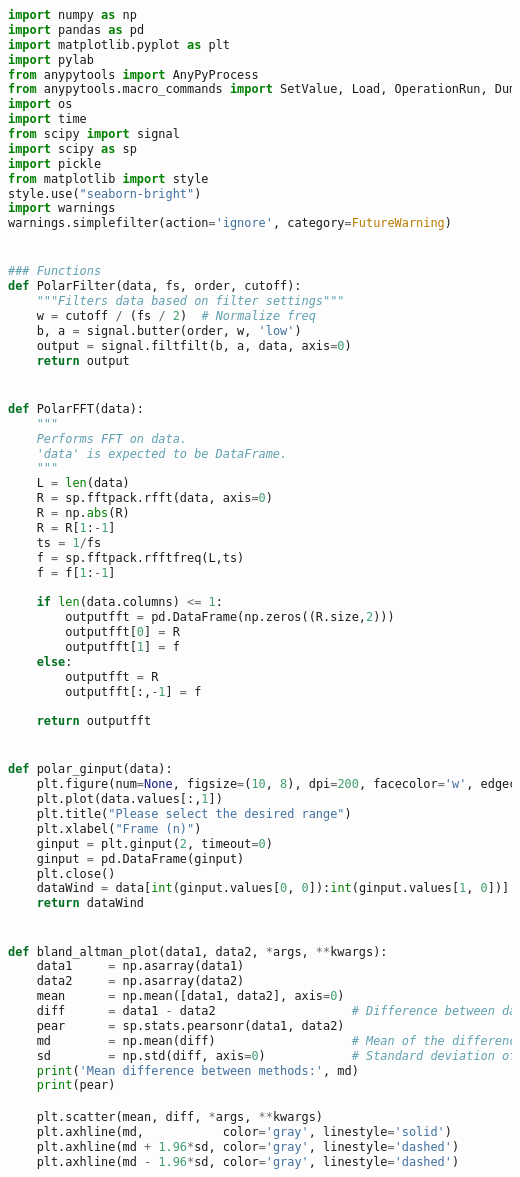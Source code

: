 \begin{lstlisting}[language=Python]
import numpy as np
import pandas as pd
import matplotlib.pyplot as plt
import pylab
from anypytools import AnyPyProcess
from anypytools.macro_commands import SetValue, Load, OperationRun, Dump
import os
import time
from scipy import signal
import scipy as sp
import pickle
from matplotlib import style
style.use("seaborn-bright")
import warnings
warnings.simplefilter(action='ignore', category=FutureWarning)


### Functions
def PolarFilter(data, fs, order, cutoff):
    """Filters data based on filter settings"""
    w = cutoff / (fs / 2)  # Normalize freq
    b, a = signal.butter(order, w, 'low')
    output = signal.filtfilt(b, a, data, axis=0)
    return output


def PolarFFT(data):
    """
    Performs FFT on data.
    'data' is expected to be DataFrame.
    """
    L = len(data)   
    R = sp.fftpack.rfft(data, axis=0)     
    R = np.abs(R)
    R = R[1:-1]
    ts = 1/fs
    f = sp.fftpack.rfftfreq(L,ts)
    f = f[1:-1]   
    
    if len(data.columns) <= 1:
        outputfft = pd.DataFrame(np.zeros((R.size,2)))
        outputfft[0] = R
        outputfft[1] = f
    else:   
        outputfft = R
        outputfft[:,-1] = f
    
    return outputfft


def polar_ginput(data):
    plt.figure(num=None, figsize=(10, 8), dpi=200, facecolor='w', edgecolor='k' )
    plt.plot(data.values[:,1])
    plt.title("Please select the desired range")
    plt.xlabel("Frame (n)") 
    ginput = plt.ginput(2, timeout=0)
    ginput = pd.DataFrame(ginput)
    plt.close()
    dataWind = data[int(ginput.values[0, 0]):int(ginput.values[1, 0])]
    return dataWind


def bland_altman_plot(data1, data2, *args, **kwargs):
    data1     = np.asarray(data1)
    data2     = np.asarray(data2)
    mean      = np.mean([data1, data2], axis=0)
    diff      = data1 - data2                   # Difference between data1 and data2
    pear      = sp.stats.pearsonr(data1, data2)
    md        = np.mean(diff)                   # Mean of the difference
    sd        = np.std(diff, axis=0)            # Standard deviation of the difference
    print('Mean difference between methods:', md)
    print(pear)

    plt.scatter(mean, diff, *args, **kwargs)
    plt.axhline(md,           color='gray', linestyle='solid')
    plt.axhline(md + 1.96*sd, color='gray', linestyle='dashed')
    plt.axhline(md - 1.96*sd, color='gray', linestyle='dashed') 



\end{lstlisting}
